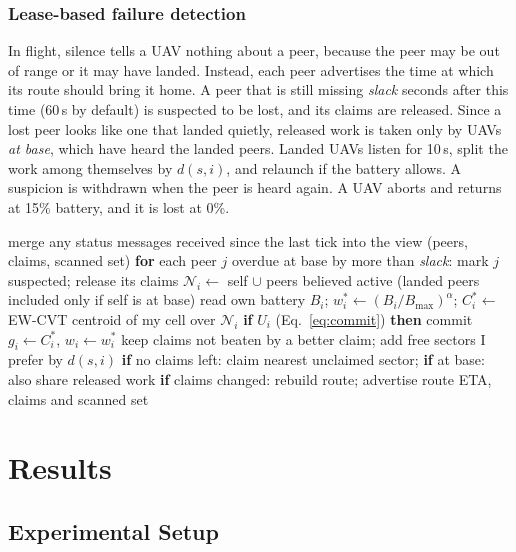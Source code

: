 \documentclass[10pt,a4paper,twocolumn]{article}
\begin{document}
\subsubsection{Lease-based failure detection}In flight, silence tells a UAV nothing about a peer, because the peer may be out of range or it may have landed. Instead, each peer advertises the time at which its route should bring it home. A peer that is still missing \textit{slack} seconds after this time (60\,s by default) is suspected to be lost, and its claims are released. Since a lost peer looks like one that landed quietly, released work is taken only by UAVs \emph{at base}, which have heard the landed peers. Landed UAVs listen for 10\,s, split the work among themselves by $d(s,i)$, and relaunch if the battery allows. A suspicion is withdrawn when the peer is heard again. A UAV aborts and returns at 15\% battery, and it is lost at 0\%.

\begin{algorithm}[t]
\caption{Control tick of one UAV (every 5\,s).}\label{alg:tick}
\small
\begin{algorithmic}[1]
\STATE merge any status messages received since the last tick into the view (peers, claims, scanned set)
\STATE \textbf{for} each peer $j$ overdue at base by more than \textit{slack}: mark $j$ suspected; release its claims
\STATE $\mathcal N_i\leftarrow$ self $\cup$ peers believed active (landed peers included only if self is at base)
\STATE read own battery $B_i$; $w_i^*\leftarrow(B_i/B_{\max})^{\alpha}$; $C_i^*\leftarrow$ EW-CVT centroid of my cell over $\mathcal N_i$
\STATE \textbf{if} $U_i$ (Eq.~\ref{eq:commit}) \textbf{then} commit $g_i\leftarrow C_i^*$, $w_i\leftarrow w_i^*$
\STATE keep claims not beaten by a better claim; add free sectors I prefer by $d(s,i)$
\STATE \textbf{if} no claims left: claim nearest unclaimed sector; \textbf{if} at base: also share released work
\STATE \textbf{if} claims changed: rebuild route; advertise route ETA, claims and scanned set
\end{algorithmic}
\end{algorithm}



\section{Results}
\subsection{Experimental Setup}\label{sec:setup}
\end{document}
